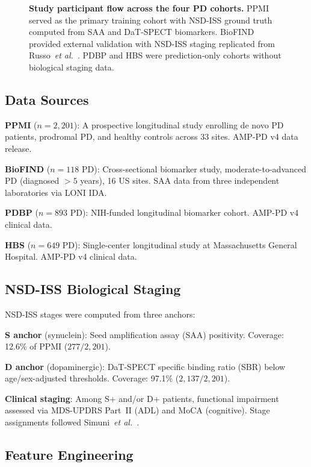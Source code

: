\documentclass[10pt,letterpaper]{article}
\begin{document}
\begin{figure}[!t]
\centering
\caption{\textbf{Study participant flow across the four PD cohorts.} PPMI served as the primary training cohort with NSD-ISS ground truth computed from SAA and DaT-SPECT biomarkers. BioFIND provided external validation with NSD-ISS staging replicated from Russo~\textit{et al.}~\cite{russo2025}. PDBP and HBS were prediction-only cohorts without biological staging data.}
\label{p1:fig:consort}
\end{figure}

\subsection*{Data Sources}
\textbf{PPMI} ($n{=}2{,}201$): A prospective longitudinal study enrolling de novo PD patients, prodromal PD, and healthy controls across 33 sites. AMP-PD v4 data release.

\textbf{BioFIND} ($n{=}118$ PD): Cross-sectional biomarker study, moderate-to-advanced PD (diagnosed ${>}5$ years), 16 US sites. SAA data from three independent laboratories via LONI IDA.

\textbf{PDBP} ($n{=}893$ PD): NIH-funded longitudinal biomarker cohort. AMP-PD v4 clinical data.

\textbf{HBS} ($n{=}649$ PD): Single-center longitudinal study at Massachusetts General Hospital. AMP-PD v4 clinical data.

\subsection*{NSD-ISS Biological Staging}
NSD-ISS stages were computed from three anchors:

\textbf{S anchor} (synuclein): Seed amplification assay (SAA) positivity. Coverage: 12.6\% of PPMI ($277/2{,}201$).

\textbf{D anchor} (dopaminergic): DaT-SPECT specific binding ratio (SBR) below age/sex-adjusted thresholds. Coverage: 97.1\% ($2{,}137/2{,}201$).

\textbf{Clinical staging}: Among S+ and/or D+ patients, functional impairment assessed via MDS-UPDRS Part~II (ADL) and MoCA (cognitive). Stage assignments followed Simuni~\textit{et al.}~\cite{simuni2024}.

\subsection*{Feature Engineering}
\label{p1:sec:methods:features}
\end{document}
